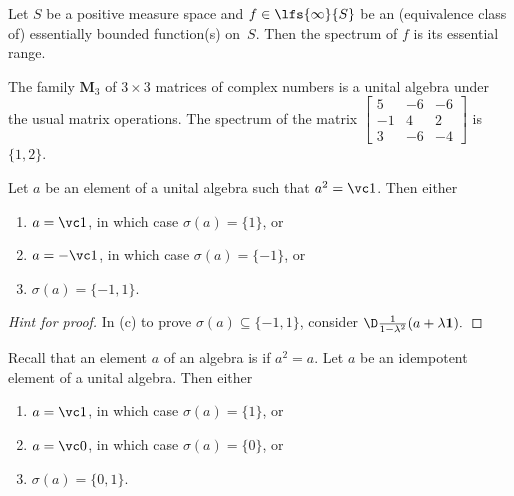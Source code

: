\begin{exam} Let $S$ be a positive measure space and $f \in \lfs{\infty}{S}$ be an
(equivalence class of) essentially bounded function(s) on~$S$. Then the
spectrum of $f$ is its essential range.
\end{exam}

\begin{exam} The family $\mathbf M_3$ of $3 \times 3$ matrices of complex numbers is a unital
algebra under the usual matrix operations. The spectrum of the matrix $\begin{bmatrix} 5
& -6 & -6 \\ -1 & 4 & 2 \\ 3 & -6 & -4 \end{bmatrix}$ is $\{1,2\}$.
\end{exam}

\begin{prop} Let $a$ be an element of a unital algebra such that $a^2 = \vc 1$.
Then either
 \begin{enumerate}[label=\rm{(\alph*)}]
  \item $a = \vc 1$, in which case $\sigma(a) = \{1\}$, or
  \item $a = -\vc 1$, in which case $\sigma(a) = \{-1\}$, or
  \item $\sigma(a) = \{-1,1\}$.
 \end{enumerate}
\end{prop}

\begin{proof}[\emph{Hint for proof}]  In (c) to prove $\sigma(a) \subseteq \{-1,1\}$,
consider $\D\frac1{1 - \lambda^2}(a + \lambda \mathbf 1).$  \ns
\end{proof}

\begin{prop} Recall that an element $a$ of an algebra is
 if $a^2 = a$. Let $a$ be an idempotent element of a unital algebra. Then
either
 \begin{enumerate}[label=\rm{(\alph*)}]
  \item $a = \vc 1$, in which case $\sigma(a) = \{1\}$, or
  \item $a = \vc 0$, in which case $\sigma(a) = \{0\}$, or
  \item $\sigma(a) = \{0,1\}$.
 \end{enumerate}
\end{prop}

